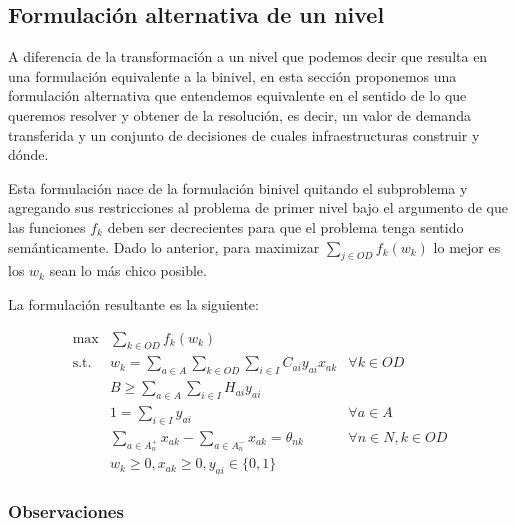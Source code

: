 \documentclass{article}
\begin{document}
  \subsection{Formulación alternativa de un nivel}
  \label{altOneLevelFormulation}

  A diferencia de la transformación a un nivel que podemos decir que resulta en una formulación equivalente a la binivel, en esta sección proponemos una formulación alternativa que entendemos equivalente en el sentido de lo que queremos resolver y obtener de la resolución, es decir, un valor de demanda transferida y un conjunto de decisiones de cuales infraestructuras construir y dónde.

  Esta formulación nace de la formulación binivel quitando el subproblema y agregando sus restricciones al problema de primer nivel bajo el argumento de que las funciones $f_k$ deben ser decrecientes para que el problema tenga sentido semánticamente. Dado lo anterior, para maximizar $\sum_{j \in OD}f_k(w_k)$ lo mejor es los $w_k$ sean lo más chico posible.

  La formulación resultante es la siguiente:

  \begin{align}
    \text{max}    & \sum_{k \in OD} f_k(w_k)                                                         & \label{eq:objectivealt} \\
    \text{s.t.}\; & w_k = \sum_{a \in A} \sum_{k \in OD} \sum_{i \in I} C_{ai}y_{ai}x_{ak}           & \forall k \in OD \label{eq:shortestpathalt} \\
                  & B \geq \sum_{a \in A} \sum_{i \in I} H_{ai}y_{ai}                                & \label{eq:respectbudgetalt} \\
                  & 1 = \sum_{i \in I} y_{ai}                                                        & \forall a \in A \label{eq:alwaysoneyalt} \\
                  & \sum_{a \in A_n^+} x_{ak} - \sum_{a \in A_n^-} x_{ak} = \theta_{nk}              & \forall n \in N, k \in OD \label{eq:flowbalancealt} \\
                  & w_k \geq 0, x_{ak} \geq 0, y_{ai} \in \{0,1\}                                    & \nonumber
  \end{align}

  \subsubsection*{Observaciones}
\end{document}
